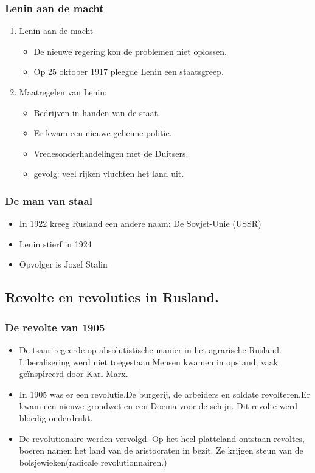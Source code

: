 \documentclass{article}
\begin{document}
\subsubsection{Lenin aan de macht}
\begin{enumerate}
    \item Lenin aan de macht
    \begin{itemize}
        \item De nieuwe regering kon de problemen niet oplossen.
        \item Op 25 oktober 1917 pleegde Lenin een staatsgreep.
    \end{itemize}
    \item Maatregelen van Lenin:
    \begin{itemize}
        \item Bedrijven in handen van de staat.
        \item Er kwam een nieuwe geheime politie.
        \item Vredesonderhandelingen met de Duitsers.
        \item gevolg: veel rijken vluchten het land uit.
    \end{itemize}
\end{enumerate}
\subsubsection{De man van staal}
\begin{itemize}
    \item In 1922 kreeg Rusland een andere naam: De Sovjet-Unie (USSR)
    \item Lenin stierf in 1924
    \item Opvolger is Jozef Stalin
\end{itemize}
\subsection{Revolte en revoluties in Rusland.}
\subsubsection{De revolte van 1905}
\begin{itemize}
    \item De tsaar regeerde op absolutistische manier in het agrarische Rusland. Liberalisering werd niet toegestaan.Mensen kwamen in opstand, vaak geïnspireerd door Karl Marx.
    \item In 1905 was er een revolutie.De burgerij, de arbeiders en soldate revolteren.Er kwam een nieuwe grondwet en een Doema voor de schijn. Dit revolte werd bloedig onderdrukt.
    \item De revolutionaire werden vervolgd. Op het heel platteland ontstaan revoltes, boeren namen het land van de aristocraten in bezit. Ze krijgen steun van de bolsjewieken(radicale revolutionnairen.)
\end{itemize}
\end{document}

